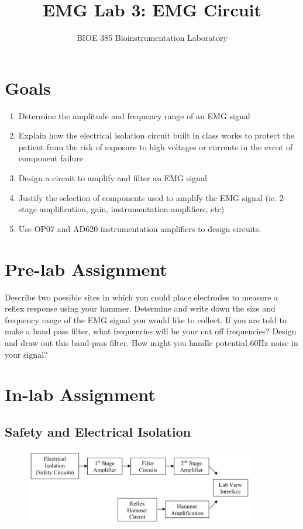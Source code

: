 \documentclass{article}
\title{EMG Lab 3: EMG Circuit}
\author{BIOE 385 Bioinstrumentation Laboratory}
\date{}
\begin{document}
\large
\maketitle

\section*{Goals}
\begin{enumerate}
	\item Determine the amplitude and frequency range of an EMG signal
	\item Explain how the electrical isolation circuit built in class works to protect the patient from the risk of exposure to high voltages or currents in the event of component failure
	\item Design a circuit to amplify and filter an EMG signal
	\item Justify the selection of components used to amplify the EMG signal (ie. 2-stage amplification, gain, instrumentation amplifiers, etc)
	\item Use OP07 and AD620 instrumentation amplifiers to design circuits.  
\end{enumerate}

\section*{Pre-lab Assignment}
Describe two possible sites in which you could place electrodes to measure a reflex response using your hammer. Determine and write down the size and frequency range of the EMG signal you would like to collect. If you are told to make a band pass filter, what frequencies will be your cut off frequencies? Design and draw out this band-pass filter. How might you handle potential 60Hz noise in your signal?

\section*{In-lab Assignment}
\subsection*{Safety and Electrical Isolation}

\begin{figure}[h]
    	\includegraphics[width=0.9\textwidth]{lab_3_fig_1.jpg}
    	\centering
		\end{figure}	
\end{document}
